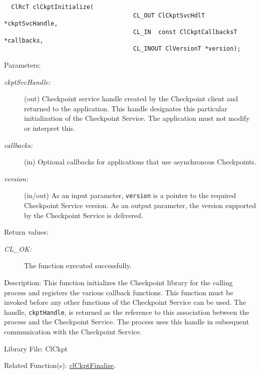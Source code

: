 \begin{flushleft}
\begin{Desc}
\footnotesize\begin{verbatim}  ClRcT clCkptInitialize(
                              		CL_OUT ClCkptSvcHdlT *ckptSvcHandle,
                              		CL_IN  const ClCkptCallbacksT *callbacks,
                              		CL_INOUT ClVersionT *version);
\end{verbatim}
\normalsize
\end{Desc}
\begin{Desc}
\item[Parameters:]
\begin{description}
\item[{\em ckpt\-Svc\-Handle:}](out) Checkpoint service handle created by the Checkpoint client and returned to the application. This handle designates 
this particular initialization of the Checkpoint Service. The application must not modify or interpret this.
\item[{\em callbacks:}](in) Optional callbacks for applications that use asynchronous Checkpoints.\item[{\em version:}](in/out) As an input parameter, 
{\tt{version}} is a pointer to the required Checkpoint Service version. As an output parameter, the version supported by the Checkpoint Service 
is delivered.\end{description}
\end{Desc}
\begin{Desc}
\item[Return values:]
\begin{description}
\item[{\em CL\_\-OK:}]The function executed successfully.\end{description}
\end{Desc}
\begin{Desc}
\item[Description:]This function initializes the Checkpoint library for the calling process and registers the various callback functions. This function 
must be invoked before any other functions of the Checkpoint Service can be used. The handle, {\tt{ckpt\-Handle}}, is returned as the reference to 
this association between the process and the Checkpoint Service. The process uses this handle in subsequent communication with the Checkpoint Service.
\end{Desc}
\begin{Desc}
\item[Library File:]Cl\-Ckpt\end{Desc}
\begin{Desc}
\item[Related Function(s):]\hyperlink{pageckpt102}{cl\-Ckpt\-Finalize}. \end{Desc}


\end{flushleft}
